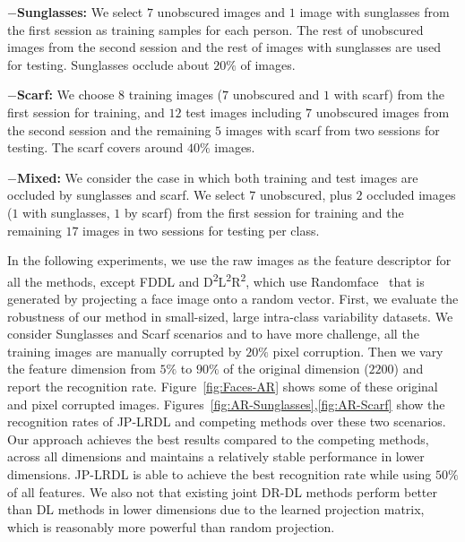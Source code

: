 \documentclass[journal]{IEEEtran}
\begin{document}
$-$\textbf{Sunglasses:} We select $7$ unobscured images and $1$ image with sunglasses from the first session as training samples for each person. The rest of unobscured images from the second session and the rest of images with sunglasses are used for testing. Sunglasses occlude about $20\%$ of images.

$-$\textbf{Scarf:} We choose $8$ training images ($7$ unobscured and $1$ with scarf) from the first session for training, and $12$ test images including $7$ unobscured images from the second session and the remaining $5$ images with scarf from two sessions for testing. The scarf covers around $40\%$ images.

$-$\textbf{Mixed:} We consider the case in which both training and test images are occluded by sunglasses and scarf. We select $7$ unobscured, plus $2$ occluded images ($1$ with sunglasses, $1$ by scarf) from the first session for training and the remaining $17$ images in two sessions for testing per class.

In the following experiments, we use the raw images as the feature descriptor for all the methods, except FDDL and D\textsuperscript{2}L\textsuperscript{2}R\textsuperscript{2}, which use Randomface~\cite{LC-KSVD} that is generated by projecting a face image onto a random vector. 
First, we evaluate the robustness of our method in small-sized, large intra-class variability datasets. We consider Sunglasses and Scarf scenarios and to have more challenge, all the training images are manually corrupted by $20\%$ pixel corruption. Then we vary the feature dimension from $5\%$ to $90\%$ of the original dimension ($2200$) and report the recognition rate. Figure~\ref{fig:Faces-AR} shows some of these original and pixel corrupted images. Figures~\ref{fig:AR-Sunglasses},\ref{fig:AR-Scarf} show the recognition rates of JP-LRDL and competing methods over these two scenarios. Our approach achieves the best results compared to the competing methods, across all dimensions and maintains a relatively stable performance in lower dimensions. JP-LRDL is able to achieve the best recognition rate while using $50\%$ of all features. We also not that existing joint DR-DL methods perform better than DL methods in lower dimensions due to the learned projection matrix, which is reasonably more powerful than random projection. 
\end{document}
